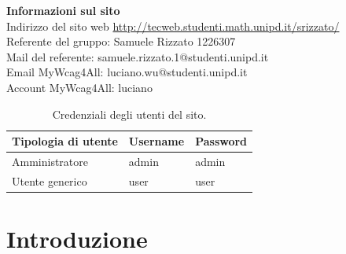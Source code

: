 \documentclass{template}
\begin{document}
\firstpage
\tableofcontents
\pagebreak

	\begin{center}
		\textbf{\large Informazioni sul sito} \\
		Indirizzo del sito web \href{http://tecweb.studenti.math.unipd.it/srizzato/}{http://tecweb.studenti.math.unipd.it/srizzato/}\\
		Referente del gruppo: Samuele Rizzato 1226307 \\
		Mail del referente: samuele.rizzato.1@studenti.unipd.it\\
		Email MyWcag4All: luciano.wu@studenti.unipd.it\\
		Account MyWcag4All: luciano
	\end{center}
	
	\begin{table}[H]
		\centering
		\begin{tabular}{|l|l|l|}
			\hline
			\textbf{Tipologia di utente}	& \textbf{Username}	& \textbf{Password} \\
			\hline
			Amministratore	        		& admin				& admin \\
			\hline
			Utente generico					& user				& user \\
			\hline
		\end{tabular}
		\caption{Credenziali degli utenti del sito.}
	\end{table}

\pagebreak

	\section{Introduzione}
\end{document}

